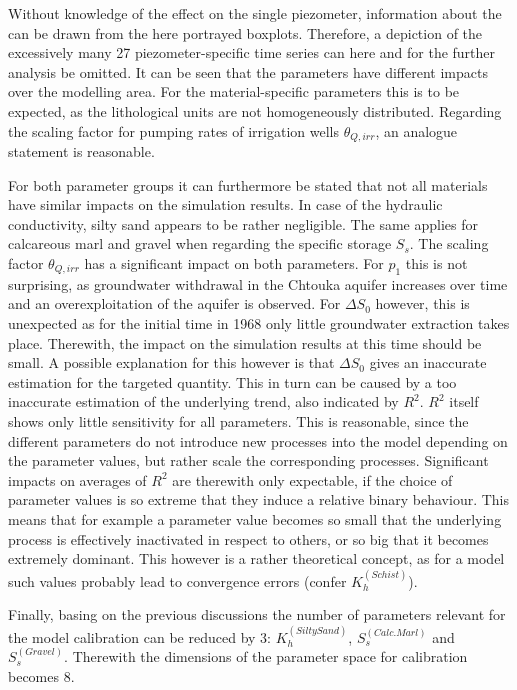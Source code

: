 Without knowledge of the effect on the single piezometer, information about the can be drawn from the here portrayed boxplots. 
Therefore, a depiction of the excessively many 27 piezometer-specific time series can here and for the further analysis be omitted. 
It can be seen that the parameters have different impacts over the modelling area. 
For the material-specific parameters this is to be expected, as the lithological units are not homogeneously distributed. 
Regarding the scaling factor for pumping rates of irrigation wells $\theta_{Q,irr}$, an analogue statement is reasonable.

For both parameter groups it can furthermore be stated that not all materials have similar impacts on the simulation results. 
In case of the hydraulic conductivity, silty sand appears to be rather negligible. 
The same applies for calcareous marl and gravel when regarding the specific storage $S_s$. 
The scaling factor $\theta_{Q,irr}$ has a significant impact on both parameters. 
For $p_1$ this is not surprising, as groundwater withdrawal in the Chtouka aquifer increases over time and an overexploitation of the aquifer is observed. 
For $\Delta S_0$ however, this is unexpected as for the initial time in 1968 only little groundwater extraction takes place. 
Therewith, the impact on the simulation results at this time should be small. 
A possible explanation for this however is that $\Delta S_0$ gives an inaccurate estimation for the targeted quantity. 
This in turn can be caused by a too inaccurate estimation of the underlying trend, also indicated by $R^2$. 
$R^2$ itself shows only little sensitivity for all parameters. 
This is reasonable, since the different parameters do not introduce new processes into the model depending on the parameter values, but rather scale the corresponding processes. 
Significant impacts on averages of $R^2$ are therewith only expectable, if the choice of parameter values is so extreme that they induce a relative binary behaviour. 
This means that for example a parameter value becomes so small that the underlying process is effectively inactivated in respect to others, or so big that it becomes extremely dominant. 
This however is a rather theoretical concept, as for a model such values probably lead to convergence errors (confer $K_h^{(Schist)}$).

Finally, basing on the previous discussions the number of parameters relevant for the model calibration can be reduced by 3: $K_h^{(Silty Sand)}$, $S_s^{(Calc. Marl)}$ and $S_s^{(Gravel)}$. 
Therewith the dimensions of the parameter space for calibration becomes 8.

